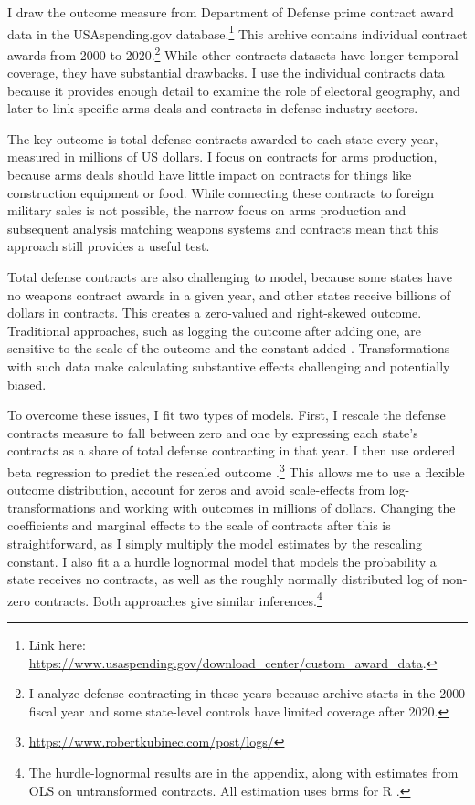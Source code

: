 \documentclass[12pt]{article}
\begin{document}
I draw the outcome measure from Department of Defense prime contract award data in the USAspending.gov database.\footnote{Link here: \url{https://www.usaspending.gov/download_center/custom_award_data}.} 
This archive contains individual contract awards from 2000 to 2020.\footnote{I analyze defense contracting in these years because archive starts in the 2000 fiscal year and some state-level controls have limited coverage after 2020.}
While other contracts datasets have longer temporal coverage, they have substantial drawbacks.
I use the individual contracts data because it provides enough detail to examine the role of electoral geography, and later to link specific arms deals and contracts in defense industry sectors. 


The key outcome is total defense contracts awarded to each state every year, measured in millions of US dollars.
I focus on contracts for arms production, because arms deals should have little impact on contracts for things like construction equipment or food.
While connecting these contracts to foreign military sales is not possible, the narrow focus on arms production and subsequent analysis matching weapons systems and contracts mean that this approach still provides a useful test. 


Total defense contracts are also challenging to model, because some states have no weapons contract awards in a given year, and other states receive billions of dollars in contracts. 
This creates a zero-valued and right-skewed outcome. 
Traditional approaches, such as logging the outcome after adding one, are sensitive to the scale of the outcome and the constant added \citep{ChenRoth2022, MullahyNorton2022}. 
Transformations with such data make calculating substantive effects challenging and potentially biased. 


To overcome these issues, I fit two types of models.
First, I rescale the defense contracts measure to fall between zero and one by expressing each state's contracts as a share of total defense contracting in that year.
I then use ordered beta regression to predict the rescaled outcome \citep{Kubinec2022}.\footnote{\url{https://www.robertkubinec.com/post/logs/}} 
This allows me to use a flexible outcome distribution, account for zeros and avoid scale-effects from log-transformations and working with outcomes in millions of dollars. 
Changing the coefficients and marginal effects to the scale of contracts after this is straightforward, as I simply multiply the model estimates by the rescaling constant.
I also fit a a hurdle lognormal model that models the probability a state receives no contracts, as well as the roughly normally distributed log of non-zero contracts. 
Both approaches give similar inferences.\footnote{The hurdle-lognormal results are in the appendix, along with estimates from OLS on untransformed contracts. All estimation uses brms for \textsf{R} \citep{Buerkner2017}.} 
\end{document}
